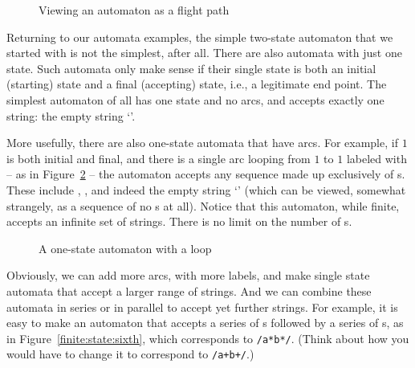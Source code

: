 \begin{underthehood}
\begin{figure}
    \caption{Viewing an automaton as a flight path}
    \label{finite:state:flights}
\end{figure}

Returning to our automata examples, the simple two-state automaton
that we started with is not the simplest, after all. There are also
automata with just one state. Such automata only make sense if their
single state is both an initial (starting) state and a final
(accepting) state, i.e., a legitimate end point. The simplest
automaton of all has one state and no arcs, and accepts exactly one
string: the empty string `'.

More usefully, there are also one-state automata that have arcs. For
example, if $1$ is both initial and final, and there is a single arc
looping from $1$ to $1$ labeled with  -- as in
Figure~\ref{finite:state:fifth} -- the automaton accepts any sequence
made up exclusively of s. These include ,
,  and indeed the empty string `' (which can
be viewed, somewhat strangely, as a sequence of no s at
all).  Notice that this automaton, while finite, accepts an infinite
set of strings. There is no limit on the number of s.

\begin{figure}
    \caption{A one-state automaton with a loop}
    \label{finite:state:fifth}
\end{figure}

Obviously, we can add more arcs, with more labels, and make single
state automata that accept a larger range of strings. And we can
combine these automata in series or in parallel to accept yet further
strings. For example, it is easy to make an automaton that accepts a
series of s followed by a series of s, as in
Figure~\ref{finite:state:sixth}, which corresponds to \texttt{/a*b*/}.
(Think about how you would have to change it to correspond to
\texttt{/a+b+/}.)


\end{underthehood}

